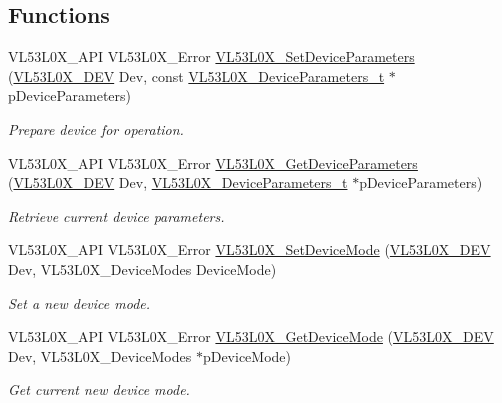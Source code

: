 \subsection*{Functions}
\begin{DoxyCompactItemize}
\item 
V\+L53\+L0\+X\+\_\+\+A\+PI V\+L53\+L0\+X\+\_\+\+Error \hyperlink{group__VL53L0X__parameters__group_ga2324960c4e2c54ab5d5788a51e985a86}{V\+L53\+L0\+X\+\_\+\+Set\+Device\+Parameters} (\hyperlink{group__VL53L0X__platform__group_ga2d6405308b1dd524b462f1b8fb97d167}{V\+L53\+L0\+X\+\_\+\+D\+EV} Dev, const \hyperlink{structVL53L0X__DeviceParameters__t}{V\+L53\+L0\+X\+\_\+\+Device\+Parameters\+\_\+t} $\ast$p\+Device\+Parameters)
\begin{DoxyCompactList}\small\item\em Prepare device for operation. \end{DoxyCompactList}\item 
V\+L53\+L0\+X\+\_\+\+A\+PI V\+L53\+L0\+X\+\_\+\+Error \hyperlink{group__VL53L0X__parameters__group_ga77d631bab7c544b6c8bcd725f224f05d}{V\+L53\+L0\+X\+\_\+\+Get\+Device\+Parameters} (\hyperlink{group__VL53L0X__platform__group_ga2d6405308b1dd524b462f1b8fb97d167}{V\+L53\+L0\+X\+\_\+\+D\+EV} Dev, \hyperlink{structVL53L0X__DeviceParameters__t}{V\+L53\+L0\+X\+\_\+\+Device\+Parameters\+\_\+t} $\ast$p\+Device\+Parameters)
\begin{DoxyCompactList}\small\item\em Retrieve current device parameters. \end{DoxyCompactList}\item 
V\+L53\+L0\+X\+\_\+\+A\+PI V\+L53\+L0\+X\+\_\+\+Error \hyperlink{group__VL53L0X__parameters__group_ga547bf7479b5ec799db4aafb7111271f7}{V\+L53\+L0\+X\+\_\+\+Set\+Device\+Mode} (\hyperlink{group__VL53L0X__platform__group_ga2d6405308b1dd524b462f1b8fb97d167}{V\+L53\+L0\+X\+\_\+\+D\+EV} Dev, V\+L53\+L0\+X\+\_\+\+Device\+Modes Device\+Mode)
\begin{DoxyCompactList}\small\item\em Set a new device mode. \end{DoxyCompactList}\item 
V\+L53\+L0\+X\+\_\+\+A\+PI V\+L53\+L0\+X\+\_\+\+Error \hyperlink{group__VL53L0X__parameters__group_ga228a691a1d324522523f4e7ff6f8c9bd}{V\+L53\+L0\+X\+\_\+\+Get\+Device\+Mode} (\hyperlink{group__VL53L0X__platform__group_ga2d6405308b1dd524b462f1b8fb97d167}{V\+L53\+L0\+X\+\_\+\+D\+EV} Dev, V\+L53\+L0\+X\+\_\+\+Device\+Modes $\ast$p\+Device\+Mode)
\begin{DoxyCompactList}\small\item\em Get current new device mode. \end{DoxyCompactList}\item 

\end{DoxyCompactItemize}
